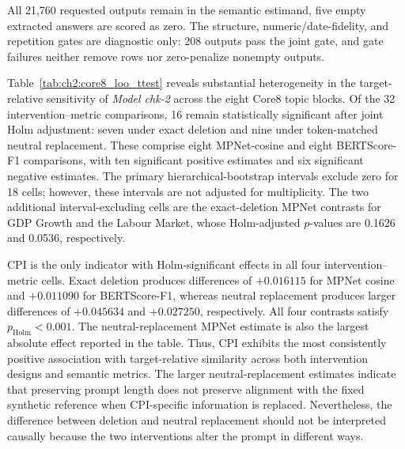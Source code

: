 \begin{table}[H]
\begin{threeparttable}
\begin{tablenotes}[flushleft]
            \item All 21,760 requested outputs remain in the semantic estimand,
            five empty extracted answers are scored as zero. The structure,
            numeric/date-fidelity, and repetition gates are diagnostic only:
            208 outputs pass the joint gate, and gate failures neither remove
            rows nor zero-penalize nonempty outputs.
        \end{tablenotes}
    \end{threeparttable}
\end{table}




Table~\ref{tab:ch2:core8_loo_ttest} reveals substantial heterogeneity in the
target-relative sensitivity of \textit{Model chk-2} across the eight Core8
topic blocks. Of the 32 intervention--metric comparisons, 16 remain
statistically significant after joint Holm adjustment: seven under exact
deletion and nine under token-matched neutral replacement. These comprise
eight MPNet-cosine and eight BERTScore-F1 comparisons, with ten significant
positive estimates and six significant negative estimates. The primary
hierarchical-bootstrap intervals exclude zero for 18 cells; however, these
intervals are not adjusted for multiplicity. The two additional
interval-excluding cells are the exact-deletion MPNet contrasts for GDP Growth
and the Labour Market, whose Holm-adjusted \(p\)-values are 0.1626 and 0.0536,
respectively.


CPI is the only indicator with Holm-significant effects in all four
intervention--metric cells. Exact deletion produces differences of
\(+0.016115\) for MPNet cosine and \(+0.011090\) for BERTScore-F1, whereas
neutral replacement produces larger differences of \(+0.045634\) and
\(+0.027250\), respectively. All four contrasts satisfy
\(p_{\mathrm{Holm}}<0.001\). The neutral-replacement MPNet estimate is also the
largest absolute effect reported in the table. Thus, CPI exhibits the most
consistently positive association with target-relative similarity across both
intervention designs and semantic metrics. The larger neutral-replacement
estimates indicate that preserving prompt length does not preserve alignment
with the fixed synthetic reference when CPI-specific information is replaced.
Nevertheless, the difference between deletion and neutral replacement should
not be interpreted causally because the two interventions alter the prompt in
different ways.


